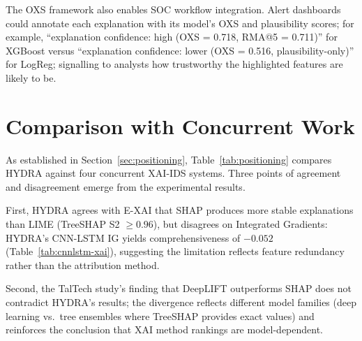 \documentclass[12pt,a4paper]{report}
\begin{document}
\begin{center}
\end{center}

The OXS framework also enables SOC workflow integration. Alert dashboards could annotate each explanation with its model's OXS and plausibility scores; for example, ``explanation confidence: high (OXS = 0.718, RMA@5 = 0.711)'' for XGBoost versus ``explanation confidence: lower (OXS = 0.516, plausibility-only)'' for LogReg; signalling to analysts how trustworthy the highlighted features are likely to be.

\section{Comparison with Concurrent Work}
\label{sec:concurrent-comparison}

As established in Section~\ref{sec:positioning}, Table~\ref{tab:positioning} compares HYDRA against four concurrent XAI-IDS systems. Three points of agreement and disagreement emerge from the experimental results.

First, HYDRA agrees with E-XAI \cite{arreche2024} that SHAP produces more stable explanations than LIME (TreeSHAP S2 $\geq 0.96$), but disagrees on Integrated Gradients: HYDRA's CNN-LSTM IG yields comprehensiveness of $-0.052$ (Table~\ref{tab:cnnlstm-xai}), suggesting the limitation reflects feature redundancy rather than the attribution method.

Second, the TalTech study's \cite{kalakoti2025} finding that DeepLIFT outperforms SHAP does not contradict HYDRA's results; the divergence reflects different model families (deep learning vs.\ tree ensembles where TreeSHAP provides exact values) and reinforces the conclusion that XAI method rankings are model-dependent.
\end{document}
